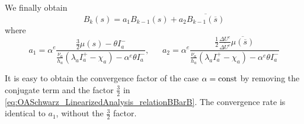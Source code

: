 We finally obtain
\begin{equation}
	B_k(s) = a_1 B_{k-1}(s) + a_2 \overline{B_{k-1}(\overline{s})}
\end{equation}
where
\begin{equation}
    a_1 = \alpha^e\frac{\frac{3}{2}\mu(s) - \theta I_a^{-}}
	{\frac{\nu_a}{h_a}\left(\lambda_a I_a^{+} - \chi_a \right)
	- \alpha^e \theta I_a^{-}}, ~~~~~~~
        a_2 = \alpha^e\frac{\frac{1}{2}\frac{\Delta U^e}{\overline{\Delta U^e}}
 \overline{\mu(\overline{s})}}
	{\frac{\nu_a}{h_a}\left(\lambda_a I_a^{+} - \chi_a \right)
	- \alpha^e \theta I_a^{-}}
\end{equation}
\begin{remark}
	It is easy to obtain the convergence factor
	of the case $\alpha={\rm const}$ by removing the conjugate
	term and the factor $\frac{3}{2}$ in
	\eqref{eq:OASchwarz_LinearizedAnalysis_relationBBarB}.
	The convergence rate is identical to $a_1$,
	without the $\frac{3}{2}$ factor.
\end{remark}
